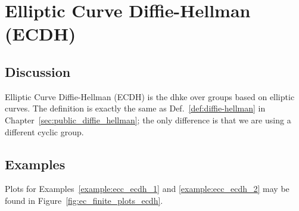 \section{Elliptic Curve Diffie-Hellman (ECDH)}
\label{sec:ecdh}

\subsection{Discussion}

Elliptic Curve Diffie-Hellman (ECDH) is the \gls{dhke} over
\glspl{group} based on \glspl{elliptic curve}.
The definition is exactly the same as
Def.~\ref{def:diffie-hellman}
in Chapter~\ref{sec:public_diffie_hellman};
the only difference is that we are using a different \gls{cyclic group}.

\subsection{Examples}

Plots for Examples~\ref{example:ecc_ecdh_1} and \ref{example:ecc_ecdh_2}
may be found in Figure~\ref{fig:ec_finite_plots_ecdh}.



